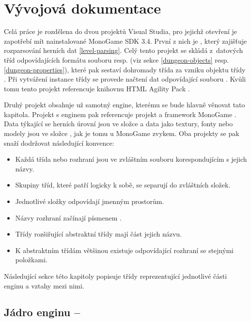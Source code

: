 \chapter{Vývojová dokumentace}
Celá práce je rozdělena do dvou projektů Visual Studia, pro jejichž otevření je zapotřebí mít nainstalované MonoGame SDK 3.4.
První z nich je , 
který zajišťuje rozparsování herních dat \vref{level-parsing}. Celý tento projekt se skládá z~datových 
tříd odpovídajících formátu souboru  resp.  (viz sekce \ref{dungeon-objects} resp. \ref{dungeon-properties}),
které pak sestaví dohromady třída  za vzniku objektu třídy .
Při vytváření instance třídy  se provede načtení dat odpovídající souboru .
Kvůli tomu tento projekt referencuje knihovnu HTML Agility Pack \cite{HtmlAgilityPack}.

Druhý projekt  obsahuje už samotný engine, kterému se bude hlavně věnovat tato kapitola.
Projekt s enginem pak referencuje projekt  a framework MonoGame \cite{MonoGame}.
Data týkající se herních úrovní jsou ve složce  a data jako textury, fonty nebo modely jsou ve složce
, jak je tomu u MonoGame zvykem.  
Oba projekty se pak snaží dodržovat následující konvence:

\begin{itemize}
\item Každá třída nebo rozhraní jsou ve zvláštním souboru korespondujícím s jejich názvy. 
\item Skupiny tříd, které patří logicky k sobě, se separují do zvláštních složek.
\item Jednotlivé složky odpovídají jmenným prostorům.
\item Názvy rozhraní začínají písmenem .
\item Třídy rozšiřující abstraktní třídy mají část jejich názvu.
\item K abstraktním třídám většinou existuje odpovídající rozhraní se stejnými položkami.
\end{itemize}

Následující sekce této kapitoly popisuje třídy reprezentující jednotlivé části enginu a vztahy mezi nimi.

\section{Jádro enginu -- }\label{engine-core-section}

